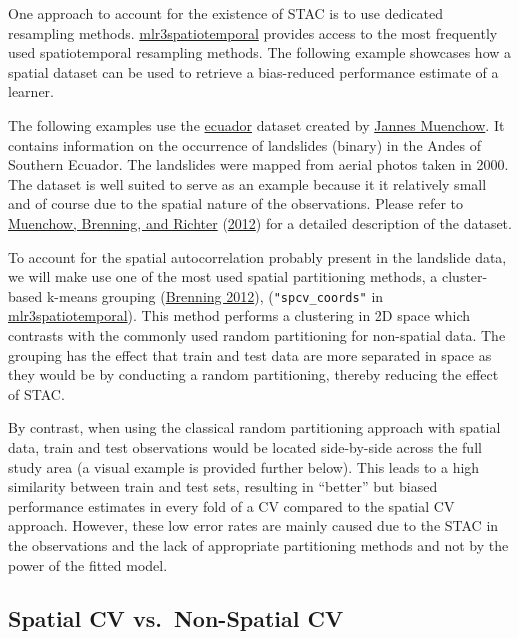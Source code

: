 \documentclass[
]{scrbook}
\begin{document}
One approach to account for the existence of STAC is to use dedicated resampling methods.
\href{https://github.com/mlr-org/mlr3spatiotemporal}{mlr3spatiotemporal} provides access to the most frequently used spatiotemporal resampling methods.
The following example showcases how a spatial dataset can be used to retrieve a bias-reduced performance estimate of a learner.

The following examples use the \href{https://mlr3spatiotempcv.mlr-org.com/reference/mlr_tasks_ecuador.html}{ecuador} dataset created by \href{https://scholar.google.com/citations?user=Slq94Y4AAAAJ\&hl=de\&authuser=1\&oi=ao}{Jannes Muenchow}.
It contains information on the occurrence of landslides (binary) in the Andes of Southern Ecuador.
The landslides were mapped from aerial photos taken in 2000.
The dataset is well suited to serve as an example because it it relatively small and of course due to the spatial nature of the observations.
Please refer to \protect\hyperlink{ref-muenchow2012}{Muenchow, Brenning, and Richter} (\protect\hyperlink{ref-muenchow2012}{2012}) for a detailed description of the dataset.

To account for the spatial autocorrelation probably present in the landslide data, we will make use one of the most used spatial partitioning methods, a cluster-based k-means grouping (\protect\hyperlink{ref-brenning2012}{Brenning 2012}), (\texttt{"spcv\_coords"} in \href{https://github.com/mlr-org/mlr3spatiotemporal}{mlr3spatiotemporal}).
This method performs a clustering in 2D space which contrasts with the commonly used random partitioning for non-spatial data.
The grouping has the effect that train and test data are more separated in space as they would be by conducting a random partitioning, thereby reducing the effect of STAC.

By contrast, when using the classical random partitioning approach with spatial data, train and test observations would be located side-by-side across the full study area (a visual example is provided further below).
This leads to a high similarity between train and test sets, resulting in ``better'' but biased performance estimates in every fold of a CV compared to the spatial CV approach.
However, these low error rates are mainly caused due to the STAC in the observations and the lack of appropriate partitioning methods and not by the power of the fitted model.

\hypertarget{sp-vs-nsp-cv}{%
\subsection{Spatial CV vs.~Non-Spatial CV}\label{sp-vs-nsp-cv}}
\end{document}
